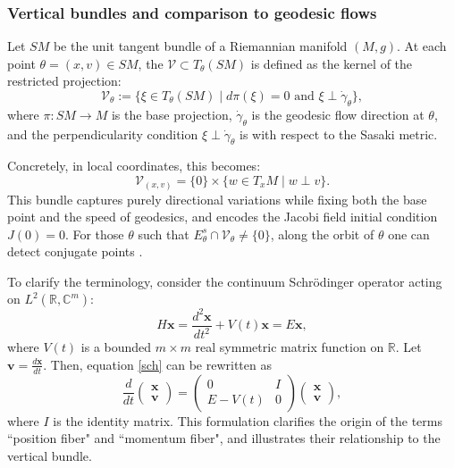 \documentclass[11pt]{amsart}
\theoremstyle{remark}
\theoremstyle{definition}
\newcommand{\V}{{\mathbf V}}
\def \V{\mathcal{V}}
\begin{document}
\subsubsection{Vertical bundles and comparison to geodesic flows}\label{ver-geo}


Let $SM$ be the unit tangent bundle of a Riemannian manifold $(M,g)$. At each point $\theta = (x,v) \in SM$, the  $\mathcal{V} \subset T_\theta(SM)$ is defined as the kernel of the restricted projection:
\[
\mathcal{V}_\theta := \{ \xi \in T_\theta(SM) \mid d\pi(\xi) = 0 \text{ and } \xi \perp \dot{\gamma}_\theta \},
\]
where $\pi : SM \to M$ is the base projection, $\dot{\gamma}_\theta$ is the geodesic flow direction at $\theta$, and the perpendicularity condition $\xi \perp \dot{\gamma}_\theta$ is with respect to the Sasaki metric.

Concretely, in local coordinates, this becomes:
\[
\mathcal{V}_{(x,v)} = \{0\} \times \{w \in T_xM \mid w \perp v \}.
\]
This bundle captures purely directional variations while fixing both the base point and the speed of geodesics, and encodes the Jacobi field initial condition 
$J(0)=0$. For those $\theta$ such that $E^s_\theta\cap \V_\theta\neq \{0\}$, along the orbit of $\theta$ one can detect conjugate points \cite{Kl74}.

To clarify the terminology, consider the continuum Schr\"odinger operator acting on $L^2(\mathbb{R}, \mathbb{C}^m)$:
\begin{equation}\label{sch}
H \mathbf{x} = \frac{d^2 \mathbf{x}}{dt^2} + V(t) \mathbf{x} = E \mathbf{x},
\end{equation}
where $V(t)$ is a bounded $m \times m$ real symmetric matrix function on $\mathbb{R}$. Let $\mathbf{v} = \frac{d\mathbf{x}}{dt}$. Then, equation \eqref{sch} can be rewritten as
$$
\frac{d}{dt} \begin{pmatrix} \mathbf{x} \\ \mathbf{v} \end{pmatrix} = \begin{pmatrix} 0 & I \\ E-V(t) & 0 \end{pmatrix} \begin{pmatrix} \mathbf{x} \\ \mathbf{v} \end{pmatrix},
$$
where $I$ is the identity matrix. This formulation clarifies the origin of the terms ``position fiber" and ``momentum fiber", and illustrates their relationship to the vertical bundle.
\end{document}
